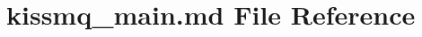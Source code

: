 \hypertarget{kissmq__main_8md}{\section{kissmq\-\_\-main.\-md File Reference}
\label{kissmq__main_8md}
}
